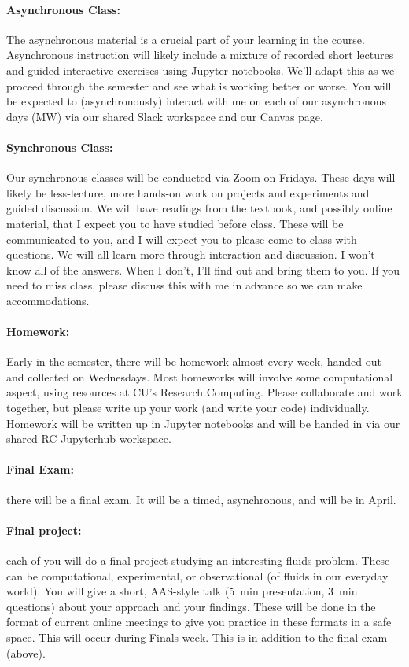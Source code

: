 \documentclass[12pt, preprint]{aastex}
\begin{document}
\paragraph{Asynchronous Class:} The asynchronous material is a crucial part of your learning in the course.  Asynchronous instruction will likely include a mixture of recorded short lectures and guided interactive exercises using  Jupyter notebooks.  We'll adapt this as we proceed through the semester and see what is working better or worse.  You will be expected to (asynchronously) interact with me on each of our asynchronous days (MW) via our shared Slack workspace and our Canvas page.

\paragraph{Synchronous Class:} Our synchronous classes will be conducted via Zoom on Fridays.  These days will likely be less-lecture, more hands-on work on projects and experiments and guided discussion.  We will have readings from the textbook, and possibly online material, that I expect you to have studied before class.  These will be communicated to you, and I will expect you to please come to class with questions.  We will all learn more through interaction and discussion.  I won't know all of the answers.  When I don't, I'll find out and bring them to you.  If you need to miss class, please discuss this with me in advance so we can make accommodations.

\paragraph{Homework:} Early in the semester, there will be homework almost every week, handed out and collected on Wednesdays.  Most homeworks will involve some computational aspect, using resources at CU's Research Computing.  Please collaborate and work together, but please write up your work (and write your code) individually.  Homework will be written up in Jupyter notebooks and will be handed in via our shared RC Jupyterhub workspace.


\paragraph{Final Exam:} there will be a final exam.  It will be a timed, asynchronous, and will be in April.

\paragraph{Final project:} each of you will do a final project studying an interesting fluids problem. These can be computational, experimental, or observational (of fluids in our everyday world). You will give a short, AAS-style talk (5~min presentation, 3~min questions) about your approach and your findings. These will be done in the format of current online meetings to give you practice in these formats in a safe space.  This will occur during Finals week. This is in addition to the final exam (above).
\end{document}
